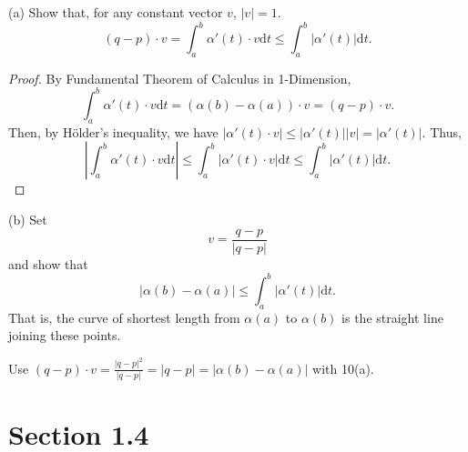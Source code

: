 \documentclass[12pt]{article}
\begin{document}
(a) Show that, for any constant vector $v$, $|v| = 1$.
     \begin{equation*}
          (q-p)\cdot v = \int_a^b \alpha'(t)\cdot v \mathrm{d}t \leq \int_a^b |\alpha'(t)| \mathrm dt.
     \end{equation*}

\begin{proof}
     By Fundamental Theorem of Calculus in 1-Dimension,
     $$\int_a^b \alpha'(t)\cdot v\mathrm dt = (\alpha(b) - \alpha(a))\cdot v = (q-p)\cdot v.$$
     Then, by H\"{o}lder's inequality, we have $|\alpha'(t)\cdot v| \leq |\alpha'(t)||v| = |\alpha'(t)|.$
     Thus, $$\left |\int_a^b \alpha'(t)\cdot v\mathrm dt\right | \leq \int_a^b |\alpha'(t)\cdot v| \mathrm dt \leq \int_a^b |\alpha'(t)| \mathrm dt.$$
\end{proof}

(b) Set $$v = \frac{q-p}{|q-p|}$$ and show that
$$|\alpha(b)-\alpha(a)| \leq \int_a^b |\alpha'(t)|\mathrm dt.$$
That is, the curve of shortest length from $\alpha(a)$ to $\alpha(b)$
is the straight line joining these points.

\begin{corollary}
     Use $(q-p)\cdot v = \frac{|q-p|^2}{|q-p|} = |q-p| = |\alpha(b) - \alpha(a)|$ with 10(a).
\end{corollary}
\section{Section 1.4}
\end{document}
